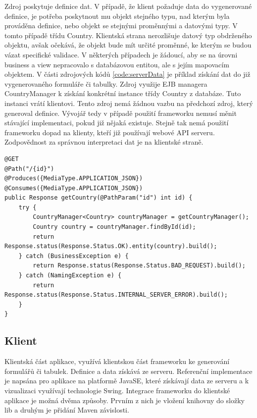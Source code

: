 Zdroj poskytuje definice dat. V případě, že klient požaduje data do vygenerované definice, je potřeba poskytnout mu objekt stejného typu, nad kterým byla prováděna definice, nebo objekt se stejnými proměnnými a datovými typy. V tomto případě třídu Country. Klientská strana nerozlišuje datový typ obdrženého objektu, avšak očekává, že objekt bude mít určité proměnné, ke kterým se budou vázat specifické validace. V některých případech je žádoucí, aby se na úrovni business a view nepracovalo s databázovou entitou, ale s jejím mapovacím objektem. V části zdrojových kódů \ref{code:serverData} je příklad získání dat do již vygenerovaného formuláře či tabulky. Zdroj využije EJB \cite{javaEE} managera CountryManager k získání konkrétní instance třídy Country z databáze. Tuto instanci vrátí klientovi. Tento zdroj nemá žádnou vazbu na předchozí zdroj, který generoval definice. Vývojář tedy v případě použití frameworku nemusí měnit stávající implementaci, pokud již nějaká existuje. Stejně tak nemá použití frameworku dopad na klienty, kteří již používají webové API serveru. Zodpovědnost za správnou interpretaci dat je na klientské straně.
\begin{lstlisting}[caption=Zdroj poskytující konkrétní instanci třídy Country,
label={code:serverData}, basicstyle=\footnotesize]
@GET
@Path("/{id}")
@Produces({MediaType.APPLICATION_JSON})
@Consumes({MediaType.APPLICATION_JSON})
public Response getCountry(@PathParam("id") int id) {
	try {
		CountryManager<Country> countryManager = getCountryManager();
		Country country = countryManager.findById(id);
		return Response.status(Response.Status.OK).entity(country).build();
	} catch (BusinessException e) {
		return Response.status(Response.Status.BAD_REQUEST).build();
	} catch (NamingException e) {
		return Response.status(Response.Status.INTERNAL_SERVER_ERROR).build();
	}
}
\end{lstlisting}

\subsection{Klient}
Klientská část aplikace, využívá klientskou část frameworku ke generování formulářů či tabulek. Definice a data získává ze serveru. Referenční implementace je napsána pro aplikace na platformě JavaSE, které získávají data ze serveru a k vizualizaci využívají technologie Swing. Integrace frameworku do klientské aplikace je možná dvěma způsoby. Prvním z nich je vložení knihovny do složky lib a druhým je přidání Maven \cite{maven} závislosti. 

